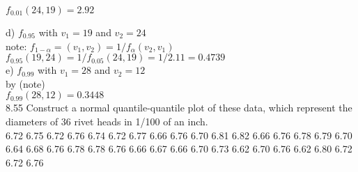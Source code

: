 $f_{0.01}(24,19) = 2.92$



d) $f_{0.95}$ with $v_1 = 19$ and $v_2 = 24$ \\

note: $f_{1-\alpha} = (v_1, v_2) = 1/f_\alpha (v_2,v_1)$ \\

$f_{0.95}(19,24) = 1/f_{0.05}(24,19) = 1/2.11 = 0.4739$ \\

e) $f_{0.99}$ with $v_1 = 28$ and $v_2 = 12$ \\

by (note) \\

$f_{0.99}(28,12) = 0.3448$ \\

8.55 Construct a normal quantile-quantile plot of
these data, which represent the diameters of 36 rivet
heads in 1/100 of an inch. \\

6.72
6.75
6.72
6.76
6.74
6.72
6.77
6.66
6.76
6.70
6.81
6.82
6.66
6.76
6.78
6.79
6.70
6.64
6.68
6.76
6.78
6.78
6.76
6.66
6.67
6.66
6.70
6.73
6.62
6.70
6.76
6.62
6.80
6.72
6.72
6.76


